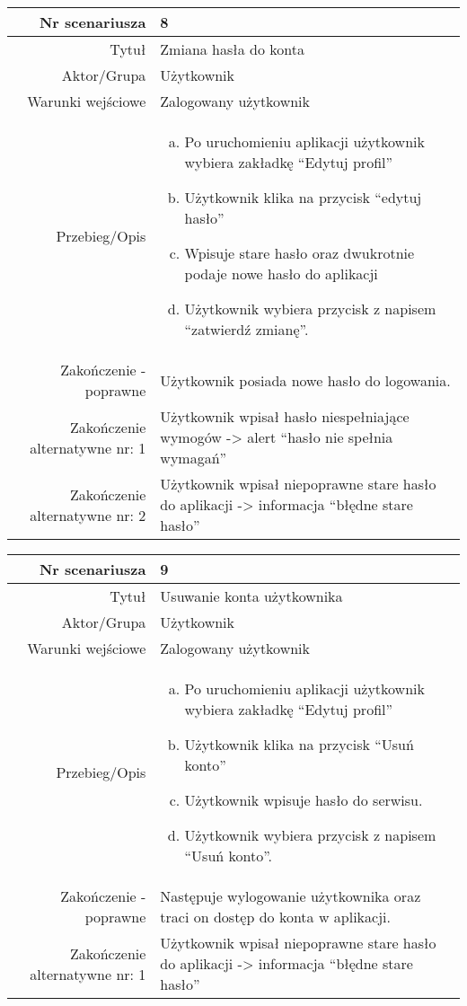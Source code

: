 \documentclass[12pt,a4paper]{article}
\begin{document}
\begin{tabular}{|r|l|} \hline
Nr scenariusza & 8 \\
\hline
Tytuł & Zmiana hasła do konta \\
\hline
Aktor/Grupa & Użytkownik \\
\hline
Warunki wejściowe & Zalogowany użytkownik \\
\hline
Przebieg/Opis & 
\begin{enumerate}[a)]
\item Po uruchomieniu aplikacji użytkownik wybiera zakładkę “Edytuj profil”
\item Użytkownik klika na przycisk “edytuj hasło”
\item Wpisuje stare hasło oraz dwukrotnie podaje nowe hasło do aplikacji
\item Użytkownik wybiera przycisk z napisem “zatwierdź zmianę”.

\end{enumerate}
\\
\hline
Zakończenie - poprawne & Użytkownik posiada nowe hasło do logowania.
\\ 
\hline
Zakończenie alternatywne nr: 1 & Użytkownik wpisał hasło niespełniające wymogów -> alert “hasło nie spełnia wymagań”
\\
\hline
Zakończenie alternatywne nr: 2 & Użytkownik wpisał niepoprawne stare hasło do aplikacji -> informacja “błędne stare hasło”
\\
\hline
\end{tabular}




\begin{tabular}{|r|l|} \hline
Nr scenariusza & 9 \\
\hline
Tytuł & Usuwanie konta użytkownika \\
\hline
Aktor/Grupa & Użytkownik \\
\hline
Warunki wejściowe & Zalogowany użytkownik \\
\hline
Przebieg/Opis & 
\begin{enumerate}[a)]
\item Po uruchomieniu aplikacji użytkownik wybiera zakładkę “Edytuj profil”
\item Użytkownik klika na przycisk “Usuń konto”
\item Użytkownik wpisuje hasło do serwisu.
\item Użytkownik wybiera przycisk z napisem “Usuń konto”.
\end{enumerate}
\\
\hline
Zakończenie - poprawne & Następuje wylogowanie użytkownika oraz traci on dostęp do konta w aplikacji.
\\ 
\hline
Zakończenie alternatywne nr: 1 & Użytkownik wpisał niepoprawne stare hasło do aplikacji -> informacja “błędne stare hasło”
\\
\hline
\end{tabular}
\begin{figure}
\centering

\end{figure}
\newpage
\end{document}
